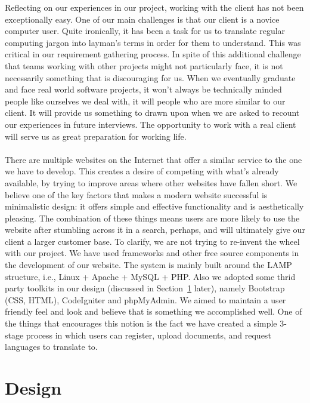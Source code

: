 \documentclass{l3proj}
\begin{document}
Reflecting on our experiences in our project, working with the client has not been exceptionally easy. One of our main challenges is that our client is a novice computer user. Quite ironically, it has been a task for us to translate regular computing jargon into layman's terms in order for them to understand. This was critical in our requirement gathering process. In spite of this additional challenge that teams working with other projects might not particularly face, it is not necessarily something that is discouraging for us. When we eventually graduate and face real world software projects, it won't always be technically minded people like ourselves we deal with, it will people who are more similar to our client. It will provide us something to drawn upon when we are asked to recount our experiences in future interviews. The opportunity to work with a real client will serve us as great preparation for working life.\\
\\
There are multiple websites on the Internet that offer a similar service to the one we have to develop. This creates a desire of competing with what's already available, by trying to improve areas where other websites have fallen short. We believe one of the key factors that makes a modern website successful is minimalistic design: it offers simple and effective functionality and is aesthetically pleasing. The combination of these things means users are more likely to use the website after stumbling across it in a search, perhaps, and will ultimately give our client a larger customer base. To clarify, we are not trying to re-invent the wheel with our project. We have used frameworks and other free source components in the development of our website. The system is mainly built around the LAMP structure, i.e., Linux + Apache + MySQL + PHP. Also we adopted some thrid party toolkits in our design (discussed in Section~\ref{chap:design} later), namely Bootstrap (CSS, HTML), CodeIgniter and phpMyAdmin. We aimed to maintain a user friendly feel and look and believe that is something we accomplished well. One of the things that encourages this notion is the fact we have created a simple 3-stage process in which users can register, upload documents, and request languages to translate to.\\   

\chapter{Design}
\label{chap:design}
\end{document}
